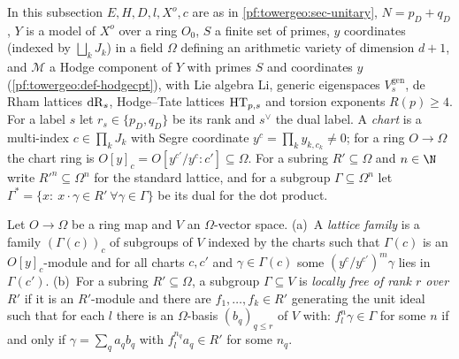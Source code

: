 In this subsection $E,H,D,l,X^o,c$ are as in \cref{pf:towergeo:sec-unitary}, $N=p_D+q_D$, $Y$ is a model of
$X^o$ over a ring $O_0$, $S$ a finite set of primes, $y$ coordinates (indexed by $\bigsqcup_kJ_k$) in a field
$\Omega$ defining an arithmetic variety of dimension $d+1$, and $\mathcal M$ a Hodge component of $Y$ with
primes $S$ and coordinates $y$ (\cref{pf:towergeo:def-hodgecpt}), with Lie algebra $\mathrm{Li}$, generic
eigenspaces $V^{\mathrm{gen}}_s$, de Rham lattices $\mathrm{dR}_s$, Hodge--Tate lattices $\mathrm{HT}_{p,s}$ and
torsion exponents $R(p)\ge4$. For a label $s$ let $r_s\in\{p_D,q_D\}$ be its rank and $s^\vee$ the dual label.
A \emph{chart} is a multi-index $c\in\prod_kJ_k$ with Segre coordinate $y^c=\prod_ky_{k,c_k}\ne0$; for a ring
$O\to\Omega$ the chart ring is $O[y]_c=O[y^{c'}/y^c:c']\subseteq\Omega$. For a subring $R'\subseteq\Omega$ and
$n\in\N$ write $R'^n\subseteq\Omega^n$ for the standard lattice, and for a subgroup $\Gamma\subseteq\Omega^n$
let $\Gamma^{*}=\{x:\ x\cdot\gamma\in R'\ \forall\gamma\in\Gamma\}$ be its dual for the dot product.

\begin{definition}\label{pf:tower:def-latfam}
Let $O\to\Omega$ be a ring map and $V$ an $\Omega$-vector space.
(a)~A \emph{lattice family} is a family $(\Gamma(c))_c$ of subgroups of $V$ indexed by the charts such that
$\Gamma(c)$ is an $O[y]_c$-module and for all charts $c,c'$ and $\gamma\in\Gamma(c)$ some
$(y^c/y^{c'})^m\gamma$ lies in $\Gamma(c')$.
(b)~For a subring $R'\subseteq\Omega$, a subgroup $\Gamma\subseteq V$ is \emph{locally free of rank $r$ over
$R'$} if it is an $R'$-module and there are $f_1,\dots,f_k\in R'$ generating the unit ideal such that for each
$l$ there is an $\Omega$-basis $(b_q)_{q\le r}$ of $V$ with: $f_l^n\gamma\in\Gamma$ for some $n$ if and only if
$\gamma=\sum_qa_qb_q$ with $f_l^{n_q}a_q\in R'$ for some $n_q$.
\end{definition}

